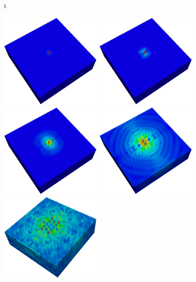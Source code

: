 \begin{figure}{t}
\begin{center}
\includegraphics[width=2in,angle=270]{figures/Wavet0.eps}
\includegraphics[width=2in,angle=270]{figures/Wavet1.eps}
\includegraphics[width=2in,angle=270]{figures/Wavet3.eps}
\includegraphics[width=2in,angle=270]{figures/Wavet10.eps}
\includegraphics[width=2in,angle=270]{figures/Wavet30.eps}

\end{center}
\end{figure}
